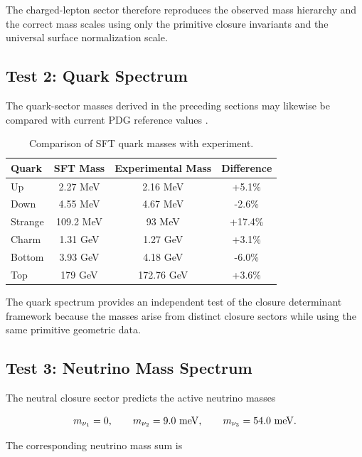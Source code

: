 \documentclass[11pt]{article}
\theoremstyle{definition}
\theoremstyle{remark}
\begin{document}
The charged-lepton sector therefore reproduces the observed
mass hierarchy and the correct mass scales using only the
primitive closure invariants and the universal surface
normalization scale.


\subsection{Test 2: Quark Spectrum}

The quark-sector masses derived in the preceding sections may
likewise be compared with current PDG reference values
\cite{PDG2024}.

\begin{table}[H]
\centering
\caption{Comparison of SFT quark masses with experiment.}
\begin{tabular}{lccc}
\toprule
Quark &
SFT Mass &
Experimental Mass &
Difference \\
\midrule
Up &
2.27 MeV &
2.16 MeV &
+5.1\% \\
Down &
4.55 MeV &
4.67 MeV &
-2.6\% \\
Strange &
109.2 MeV &
93 MeV &
+17.4\% \\
Charm &
1.31 GeV &
1.27 GeV &
+3.1\% \\
Bottom &
3.93 GeV &
4.18 GeV &
-6.0\% \\
Top &
179 GeV &
172.76 GeV &
+3.6\% \\
\bottomrule
\end{tabular}
\end{table}

The quark spectrum provides an independent test of the closure
determinant framework because the masses arise from distinct
closure sectors while using the same primitive geometric data.


\subsection{Test 3: Neutrino Mass Spectrum}

The neutral closure sector predicts the active neutrino masses

\begin{equation}
m_{\nu_1}=0,
\qquad
m_{\nu_2}=9.0~{\rm meV},
\qquad
m_{\nu_3}=54.0~{\rm meV}.
\end{equation}

The corresponding neutrino mass sum is
\end{document}
